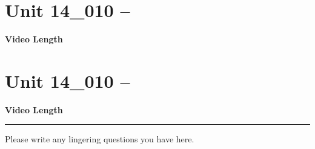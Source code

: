 \documentclass[letterpaper,12pt]{exam}
\newcommand{\unit}{Unit 14}
\begin{document}
\begin{questions}

\section*{\unit\_010 -- } 
\par{\selectfont\textbf{Video Length }}


\section*{\unit\_010 -- } 
\par{\selectfont\textbf{Video Length }}



\begin{center}
    \rule{0.5\textwidth}{.4pt}
\end{center}
Please write any lingering questions you have here.
\end{questions}
\end{document}
